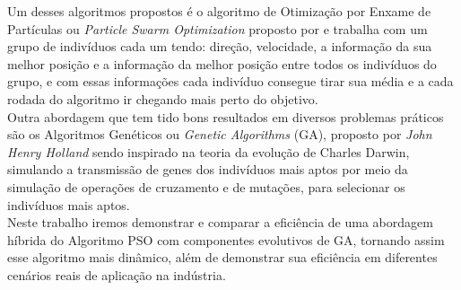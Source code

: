 Um desses algoritmos propostos é o algoritmo de Otimização por Enxame de Partículas ou \textit{Particle Swarm Optimization} proposto por \cite{Kennedy1995} e trabalha com um grupo de indivíduos cada um tendo: direção, velocidade, a informação da sua melhor posição e a informação da melhor posição entre todos os indivíduos do grupo, e com essas informações cada indivíduo consegue tirar sua média e a cada rodada do algoritmo ir chegando mais perto do objetivo.\\
Outra abordagem que tem tido bons resultados em diversos problemas práticos \cite{Qing2012} são os Algoritmos Genéticos ou \textit{Genetic Algorithms} (GA), proposto por \textit{John Henry Holland} sendo inspirado na teoria da evolução de Charles Darwin, simulando a transmissão de genes dos indivíduos mais aptos por meio da simulação de operações de cruzamento e de mutações, para selecionar os indivíduos mais aptos.\\
Neste trabalho iremos demonstrar e comparar a eficiência de uma abordagem híbrida do Algoritmo PSO com componentes evolutivos de GA, tornando assim esse algoritmo mais dinâmico, além de demonstrar sua eficiência em diferentes cenários reais de aplicação na indústria.

